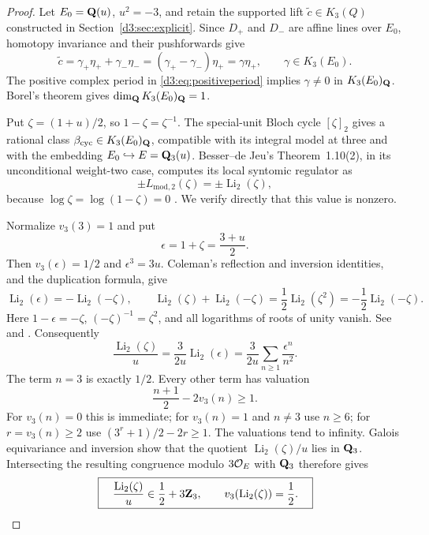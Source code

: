 \begin{proof}
Let $E_0=\mathbf Q(u)$, $u^2=-3$, and retain the supported lift $\widetilde c\in K_3(Q)$ constructed in Section~\ref{d3:sec:explicit}. Since $D_+$ and $D_-$ are affine lines over $E_0$, homotopy invariance and their pushforwards give
\[
\widetilde c=\gamma_+\eta_++\gamma_-\eta_-
=(\gamma_+-\gamma_-)\eta_+=\gamma\eta_+,
\qquad \gamma\in K_3(E_0).
\]
The positive complex period in \eqref{d3:eq:positiveperiod} implies $\gamma\ne0$ in $K_3(E_0)_{\mathbf Q}$. Borel's theorem \cite[Proposition~12.2]{Borel} gives $\dim_{\mathbf Q}K_3(E_0)_{\mathbf Q}=1$.

Put $\zeta=(1+u)/2$, so $1-\zeta=\zeta^{-1}$. The special-unit Bloch cycle $[\zeta]_2$ gives a rational class $\beta_{\mathrm{cyc}}\in K_3(E_0)_{\mathbf Q}$, compatible with its integral model at three and with the embedding $E_0\hookrightarrow E=\mathbf Q_3(u)$. Besser--de Jeu's Theorem~1.10(2), in its unconditional weight-two case, computes its local syntomic regulator as
\[
\pm L_{\mathrm{mod},2}(\zeta)=\pm\operatorname{Li}_2(\zeta),
\]
because $\log\zeta=\log(1-\zeta)=0$ \cite{BesserDeJeu}. We verify directly that this value is nonzero.

Normalize $v_3(3)=1$ and put
\[
 \epsilon=1+\zeta=\frac{3+u}{2}.
\]
Then $v_3(\epsilon)=1/2$ and $\epsilon^3=3u$.
Coleman's reflection and inversion identities, and the duplication
formula, give
\[
 \operatorname{Li}_2(\epsilon)
 =-\operatorname{Li}_2(-\zeta),\qquad
 \operatorname{Li}_2(\zeta)+\operatorname{Li}_2(-\zeta)
 =\frac12\operatorname{Li}_2(\zeta^2)
 =-\frac12\operatorname{Li}_2(-\zeta).
\]
Here $1-\epsilon=-\zeta$, $( -\zeta)^{-1}=\zeta^2$,
and all logarithms of roots of unity vanish. See
\cite[equation~(1.2) and (2.4)]{BesserDeJeu}
and \cite[p.~377]{BesserDeJeuCurves}.
Consequently
\[
 \frac{\operatorname{Li}_2(\zeta)}u
 =\frac{3}{2u}\operatorname{Li}_2(\epsilon)
 =\frac{3}{2u}\sum_{n\geq1}\frac{\epsilon^n}{n^2}.
\]
The term $n=3$ is exactly $1/2$. Every other term has valuation
\[
 \frac{n+1}{2}-2v_3(n)\geq1.
\]
For $v_3(n)=0$ this is immediate; for $v_3(n)=1$ and $n\ne3$
use $n\geq6$; for $r=v_3(n)\geq2$ use
$(3^r+1)/2-2r\geq1$. The valuations tend to infinity.
Galois equivariance and inversion show that the quotient
$\operatorname{Li}_2(\zeta)/u$ lies in $\mathbf Q_3$.
Intersecting the resulting congruence modulo $3\mathcal O_E$ with
$\mathbf Q_3$ therefore gives
\begin{equation}\label{d3:eq:localdilog}
\boxed{\quad
\frac{\operatorname{Li}_2(\zeta)}u\in\frac12+3\mathbf Z_3,
\qquad v_3(\operatorname{Li}_2(\zeta))=\frac12.
\quad}
\end{equation}


\end{proof}
